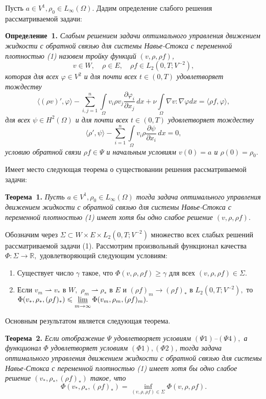 Пусть $a\in V^1, \rho_0\in L_\infty(\Omega).$ Дадим определение слабого решения рассматриваемой задачи:

\textbf{Определение~1.} {\it Слабым решением задачи оптимального уп\-равления движением жидкости с обратной связью для системы Навье-Стокса с переменной плотностью (1) назовем тройку функций $({v},\rho,\rho f)$,
$$
{v}\in W,\quad \rho \in E, \quad \rho f\in L_2(0,T;V^{-2}),
$$
которая для всех $\varphi\in V^2$ и для почти всех $t\in(0,T)$ удовлетворяет тождеству
$$
\langle(\rho v)',\varphi\rangle-\sum_{i,j=1}^n\int\limits_{\Omega}{v}_i \rho {v}_j\frac{\partial \varphi_i}{\partial x_j}\,dx+\nu \int\limits_{\Omega} \nabla v: \nabla \varphi dx=\langle \rho f,\varphi\rangle,
$$
для всех $\psi\in H^2(\Omega)$ и для почти всех $t\in(0,T)$ удовлетворяет тождеству
$$
\langle\rho',\psi\rangle -\sum_{i=1}^n\int\limits_{\Omega}{v}_i \rho \frac{\partial \psi}{\partial x_i}\,dx=0,
$$
условию обратной связи $\rho f \in \Psi$ и начальным условиям ${v}(0)=a$ и $\rho(0)=\rho_0.$}

Имеет место следующая теорема о существовании решения рассматриваемой задачи:

\textbf{Теорема~1.} {\it Пусть $a\in V^1, \rho_0\in L_\infty(\Omega)$ тогда задача оптимального уп\-равления движением жидкости с обратной связью для системы Навье-Стокса с переменной плотностью (1) имеет хотя бы одно слабое решение $({v},\rho, \rho f).$}

\renewcommand{\theenumi}{\arabic{enumi}}
\renewcommand{\labelenumi}{($\Phi$\theenumi)}
\par Обозначим через $\Sigma \subset W\times E\times {L}_2(0,T;V^{-2})$ множество всех слабых решений рассматриваемой задачи (1). Рассмотрим
произвольный функционал качества $\Phi: \Sigma \to \mathbb{R},$
удовлетворяющий следующим условиям:
\begin{enumerate}
\item Существует число $\gamma$ такое, что $\Phi (v,\rho, \rho f) \geqslant \gamma$ для всех $(v,\rho, \rho f)\in \Sigma.$
\item Если $v_m \rightharpoonup v_*$ в $W,$ $\rho_m \rightharpoonup \rho_*$ в $E$ и $(\rho f)_m \to (\rho f)_*$ в
${L}_2(0,T;V^{-2}),$ то $\Phi (v_*,\rho_*,(\rho f)_*) \leqslant
\varliminf\limits_{m\to \infty} \Phi (v_m,\rho_m,(\rho f)_m).$
\end{enumerate}
Основным результатом является следующая теорема.

\textbf{Теорема~2.} {\it Если отображение $\Psi$ удовлетворяет условиям
$(\Psi 1)$--$(\Psi 4),$ а функционал $\Phi$ удовлетворяет условиям $(\Phi 1),(\Phi 2)$, тогда задача оптимального уп\-равления движением жидкости с обратной связью для системы Навье-Стокса с переменной плотностью (1) имеет хотя бы одно слабое решение $(v_*,\rho_*,(\rho f)_*)$ такое, что
$$
\Phi (v_*,\rho_*,(\rho f)_*) = \inf\limits_{(v,\rho, \rho f)\in \Sigma}
\Phi (v,\rho,\rho f).$$}

